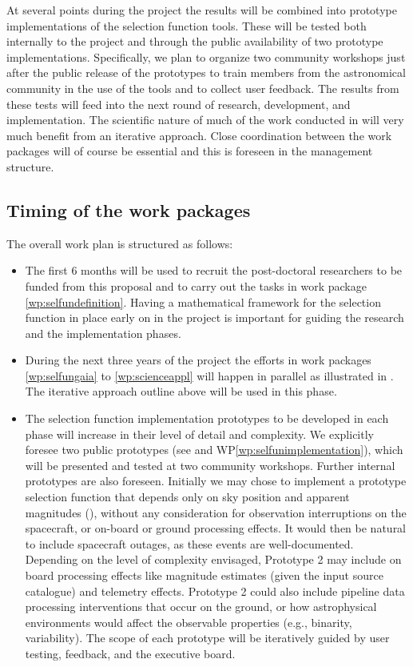 At several points during the project the results will be combined into prototype implementations of the selection function tools. These will be tested both internally to the project and through the public availability of two prototype implementations. Specifically, we plan to organize two community workshops just after the public release of the prototypes to train members from the astronomical community in the use of the tools and to collect user feedback. The results from these tests will feed into the next round of research, development, and implementation. The scientific nature of much of the work conducted in {\acro} will very much benefit from an iterative approach. Close coordination between the work packages will of course be essential and this is foreseen in the management structure.

\subsection{Timing of the work packages}
\label{sec:wptiming}

The overall work plan is structured as follows:
\begin{itemize}
    \item The first 6 months will be used to recruit the post-doctoral researchers to be funded from this proposal and to carry out the tasks in work package \ref{wp:selfundefinition}. Having a mathematical framework for the selection function in place early on in the project is important for guiding the research and the implementation phases.
    \item During the next three years of the project the efforts in work packages \ref{wp:selfungaia} to \ref{wp:scienceappl} will happen in parallel as illustrated in . The iterative approach outline above will be used in this phase.
    \item The selection function implementation prototypes to be developed in each phase will increase in their level of detail and complexity. We explicitly foresee two public prototypes (see  and WP\ref{wp:selfunimplementation}), which will be presented and tested at two community workshops. Further internal prototypes are also foreseen. Initially we may chose to implement a prototype selection function that depends only on sky position and apparent magnitudes (), without any consideration for observation interruptions on the spacecraft, or on-board or ground processing effects. It would then be natural to include spacecraft outages, as these events are well-documented. Depending on the level of complexity envisaged, Prototype 2 may include on board processing effects like magnitude estimates (given the input source catalogue) and telemetry effects. Prototype 2 could also include pipeline data processing interventions that occur on the ground, or how astrophysical environments would affect the observable properties (e.g., binarity, variability). The scope of each prototype will be iteratively guided by user testing, feedback, and the executive board.
 \end{itemize}

